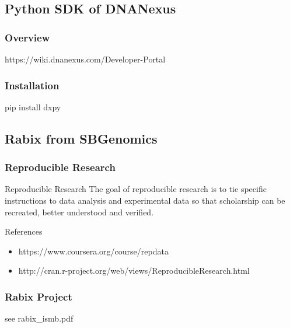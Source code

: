 \documentclass[UTF8]{beamer}
\begin{document}
\subsection{Python SDK of DNANexus}

\begin{frame}
  \frametitle{Overview}
  https://wiki.dnanexus.com/Developer-Portal
\end{frame}

\begin{frame}
  \frametitle{Installation}
  pip install dxpy
\end{frame}

\subsection{Rabix from SBGenomics}

\begin{frame}
  \frametitle{Reproducible Research}
  \begin{block}{Reproducible Research}
The goal of reproducible research is to tie specific instructions to data
analysis and experimental data so that scholarship can be recreated, better understood and verified.
  \end{block}
  \begin{block}{References}
    \begin{itemize}
      \item https://www.coursera.org/course/repdata
      \item http://cran.r-project.org/web/views/ReproducibleResearch.html
    \end{itemize}
  \end{block}
\end{frame}

\begin{frame}
  \frametitle{Rabix Project}
  see rabix_ismb.pdf
\end{frame}
\end{document}
